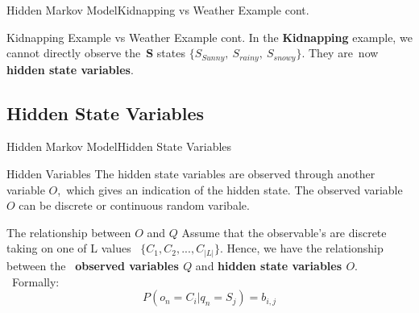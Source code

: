 \documentclass[10pt]{beamer}
\begin{document}
\begin{frame}{Hidden Markov Model}{Kidnapping vs Weather Example cont.}
   \begin{block}{Kidnapping Example vs Weather Example cont.}
     In the \textbf{Kidnapping} example, we cannot directly observe the\
     \textbf{S} states {$\{S_{Sunny},\ S_{rainy},\ S_{snowy}\}$}. They are\
     now \textbf{hidden state variables}.
   \end{block}
\end{frame}

\subsection{Hidden State Variables}
\begin{frame}[allowframebreaks]{Hidden Markov Model}{Hidden State Variables}
   \begin{block}{Hidden Variables}
       The hidden state variables are observed through another variable $O$,\
       which gives an indication of the hidden state\cite{Anders}.
       The observed variable $O$ can be discrete or continuous random varibale.
   \end{block}
   \begin{block}{The relationship between $O$ and $Q$}
        Assume that the observable's are discrete taking on one of L values \
        $\{C_1, C_2,...,C_{|L|}\}$. Hence, we have the relationship between the\
       \textbf{ observed variables $Q$} and \textbf{hidden state variables $O$}. \
       Formally:\\
             \begin{equation}
             \label{rela_M_Y}
                  P(o_n = C_i|q_n = S_j) = b_{i,j}
             \end{equation}
   \end{block}
\end{frame}

\end{document}

